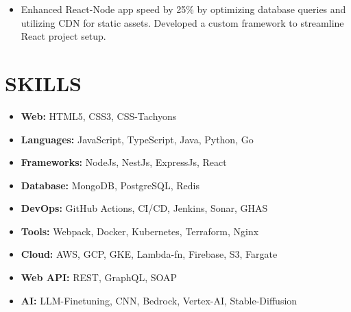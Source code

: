 \documentclass[line, margin, 12pt]{res}
\begin{document}
\begin{resume}
\begin{itemize}
\item Enhanced React-Node app speed by 25\% by optimizing database queries and utilizing CDN for static assets. Developed a custom framework to streamline React project setup.
\end{itemize}


\section{SKILLS}
\begin{itemize}
\item \textbf{Web:} HTML5, CSS3, CSS-Tachyons
\item \textbf{Languages:} JavaScript, TypeScript, Java, Python, Go
\item \textbf{Frameworks:} NodeJs, NestJs, ExpressJs, React
\item \textbf{Database:} MongoDB, PostgreSQL, Redis
\item \textbf{DevOps:} GitHub Actions, CI/CD, Jenkins, Sonar, GHAS
\item \textbf{Tools:} Webpack, Docker, Kubernetes, Terraform, Nginx
\item \textbf{Cloud:} AWS, GCP, GKE, Lambda-fn, Firebase, S3, Fargate
\item \textbf{Web API:} REST, GraphQL, SOAP
\item \textbf{AI:} LLM-Finetuning, CNN, Bedrock, Vertex-AI, Stable-Diffusion
\end{itemize}

\end{resume}
\end{document}
